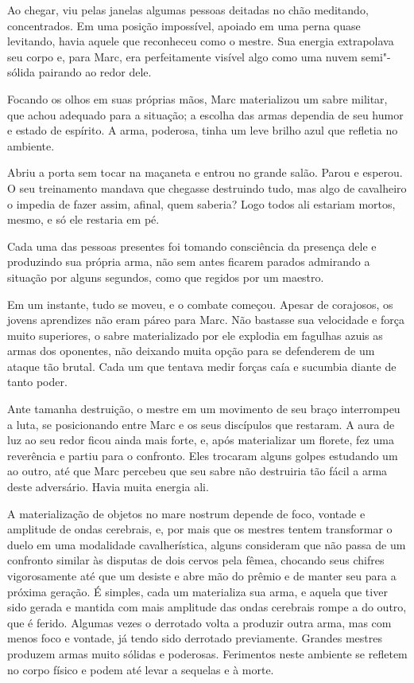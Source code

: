 Ao chegar, viu pelas janelas algumas pessoas deitadas no chão meditando,
concentrados. Em uma posição impossível, apoiado em uma perna quase
levitando, havia aquele que reconheceu como o mestre. Sua energia
extrapolava seu corpo e, para Marc, era perfeitamente visível algo como uma
nuvem semi"-sólida pairando ao redor dele.

Focando os olhos em suas próprias mãos, Marc materializou um sabre
militar, que achou adequado para a situação; a escolha das armas
dependia de seu humor e estado de espírito. A arma, poderosa, tinha um
leve brilho azul que refletia no ambiente.

Abriu a porta sem tocar na
maçaneta e entrou no grande salão. Parou e esperou.
O seu treinamento mandava que chegasse destruindo tudo, mas algo de
cavalheiro o impedia de fazer assim, afinal, quem saberia? Logo todos
ali estariam mortos, mesmo, e só ele restaria em pé.

Cada uma das pessoas presentes foi tomando consciência da presença dele
e produzindo sua própria arma, não sem antes ficarem parados admirando a
situação por alguns segundos, como que regidos por um maestro.

Em um instante, tudo se moveu, e o combate começou. Apesar de corajosos,
os jovens aprendizes não eram páreo para Marc. Não bastasse sua
velocidade e força muito superiores, o sabre materializado por ele
explodia em fagulhas azuis as armas dos oponentes, não deixando muita
opção para se defenderem de um ataque tão brutal. Cada um que tentava
medir forças caía e sucumbia diante de tanto poder.

Ante tamanha destruição, o mestre em um movimento de seu braço
interrompeu a luta, se posicionando entre Marc e os seus discípulos que
restaram. A aura de luz ao seu redor ficou ainda mais forte, e, após
materializar um florete, fez uma reverência e partiu para o confronto.
Eles trocaram alguns golpes estudando um ao outro, até que Marc percebeu
que seu sabre não destruiria tão fácil a arma deste adversário. Havia
muita energia ali.

A materialização de objetos no mare nostrum depende de foco, vontade e
amplitude de ondas cerebrais, e, por mais que os mestres tentem transformar
o duelo em uma modalidade cavalherística, alguns consideram que não
passa de um confronto similar às disputas de dois cervos pela fêmea,
chocando seus chifres vigorosamente até que um desiste e abre mão do
prêmio e de manter seu  para a próxima geração. É simples, cada um
materializa sua arma, e aquela que tiver sido gerada e
mantida com mais amplitude das ondas cerebrais rompe a do outro, que é
ferido. Algumas vezes o derrotado volta a produzir outra arma, mas com
menos foco e vontade, já tendo sido derrotado previamente. Grandes
mestres produzem armas muito sólidas e poderosas. Ferimentos neste
ambiente se refletem no corpo físico e podem até levar a sequelas e à
morte.

